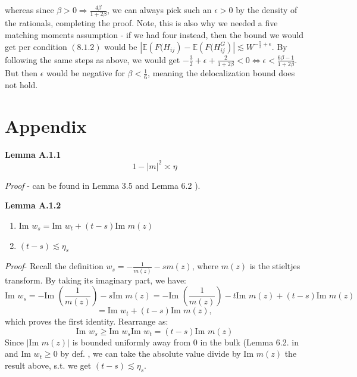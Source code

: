\documentclass[11pt]{article}
\newenvironment{boxt}[1]
  {\begin{mdframed}\noindent\textbf{#1}\normalfont\space}
  {\end{mdframed}}
\newcommand{\im}{\text{Im }}
\begin{document}
  whereas since $\beta>0\Rightarrow \frac{4\beta}{1+2\beta}$, we can always pick such an $\epsilon>0$ by the density of the rationals, completing the proof. Note, this is also why we needed a five matching moments assumption - if we had four instead, then the bound we would get per condition $(8.1.2)$ would be $\left\vert \mathbb{E}\left(F(H_{ij}\right) - \mathbb{E}\left(F(H_{ij}^G\right)\right\vert\lesssim W^{-\frac{5}{2}+\epsilon}$. By following the same steps as above, we would get $-\frac{3}{2}+\epsilon+\frac{2}{1+2\beta}<0\Leftrightarrow \epsilon< \frac{6\beta-1}{1+2\beta}$.  But then $\epsilon$ would be negative for $\beta<\frac{1}{6}$, meaning the delocalization bound does not hold. 
  







\newpage




\section{Appendix}
\label{sec:appendix}

\begin{boxt}{Lemma A.1.1} \label{lemma-a11} $$ 1-|m|^2 \asymp \eta$$ 
\end{boxt}
\textit{Proof} - can be found in Lemma 3.5 \cite{21} and Lemma 6.2 \cite{dynamic}). 

\begin{boxt}{Lemma A.1.2} \label{lemma-a12} 
\begin{enumerate}
\item $ \im w_s = \im w_t + (t-s)\im m(z)$ 
\item $(t-s)\lesssim \eta_s $
\end{enumerate}

\end{boxt}
\textit{Proof}- Recall the definition $w_s = -\frac{1}{m(z)} - sm(z)$, where $m(z)$ is the stieltjes transform. By taking its imaginary part, we have: $$\im w_s = -\im \left( \frac{1}{m(z)}\right)-s\im m(z)= -\im \left( \frac{1}{m(z)}\right)-t\im m(z) + (t-s)\im m(z)$$
$$=\im w_t + (t-s)\im m(z),$$
which proves the first identity. Rearrange as: 
$$\im w_s\geq \im w_s\im w_t= (t-s)\im m(z)$$
Since $|\im m(z)|$ is bounded uniformly away from $0$ in the bulk (Lemma 6.2. in \cite{dynamic} and $\im w_t\geq 0$ by def. , we can take the absolute value divide by $\im m(z)$ the result above, s.t. we get $(t-s)\lesssim \eta_s$. 
\end{document}
